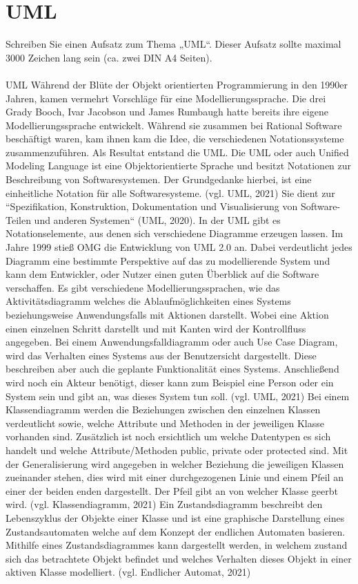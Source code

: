 \section{UML}
Schreiben Sie einen Aufsatz zum Thema „UML“. Dieser Aufsatz sollte maximal 3000 Zeichen lang sein (ca. zwei DIN A4 Seiten).\\
\\
UML
Während der Blüte der Objekt orientierten Programmierung in den 1990er Jahren, kamen vermehrt Vorschläge für eine Modellierungssprache. Die drei Grady Booch, Ivar Jacobson und James Rumbaugh hatte bereits ihre eigene Modellierungssprache entwickelt. Während sie zusammen bei Rational Software beschäftigt waren, kam ihnen kam die Idee, die verschiedenen Notationssysteme zusammenzuführen. Als Resultat entstand die UML. Die UML oder auch Unified Modeling Language ist eine Objektorientierte Sprache und besitzt Notationen zur Beschreibung von Softwaresystemen. Der Grundgedanke hierbei, ist eine einheitliche Notation für alle Softwaresysteme. (vgl. UML, 2021) Sie dient zur “Spezifikation, Konstruktion, Dokumentation und Visualisierung von Software-Teilen und anderen Systemen“ (UML, 2020). In der UML gibt es Notationselemente, aus denen sich verschiedene Diagramme erzeugen lassen. Im Jahre 1999 stieß OMG die Entwicklung von UML 2.0 an. Dabei verdeutlicht jedes Diagramm eine bestimmte Perspektive auf das zu modellierende System und kann dem Entwickler, oder Nutzer einen guten Überblick auf die Software verschaffen.
Es gibt verschiedene Modellierungssprachen, wie das Aktivitätsdiagramm welches die Ablaufmöglichkeiten eines Systems beziehungsweise Anwendungsfalls mit Aktionen darstellt. Wobei eine Aktion einen einzelnen Schritt darstellt und mit Kanten wird der Kontrollfluss angegeben.
Bei einem Anwendungsfalldiagramm oder auch Use Case Diagram, wird das Verhalten eines Systems aus der Benutzersicht dargestellt. Diese beschreiben aber auch die geplante Funktionalität eines Systems. Anschließend wird noch ein Akteur benötigt, dieser kann zum Beispiel eine Person oder ein System sein und gibt an, was dieses System tun soll. (vgl. UML, 2021)
Bei einem Klassendiagramm werden die Beziehungen zwischen den einzelnen Klassen verdeutlicht sowie, welche Attribute und Methoden in der jeweiligen Klasse vorhanden sind. Zusätzlich ist noch ersichtlich um welche Datentypen es sich handelt und welche Attribute/Methoden public, private oder protected sind. Mit der Generalisierung wird angegeben in welcher Beziehung die jeweiligen Klassen zueinander stehen, dies wird mit einer durchgezogenen Linie und einem Pfeil an einer der beiden enden dargestellt. Der Pfeil gibt an von welcher Klasse geerbt wird. (vgl. Klassendiagramm, 2021)
Ein Zustandsdiagramm beschreibt den Lebenszyklus der Objekte einer Klasse und ist eine graphische Darstellung eines Zustandsautomaten welche auf dem Konzept der endlichen Automaten basieren. Mithilfe eines Zustandsdiagrammes kann dargestellt werden, in welchem zustand sich das betrachtete Objekt befindet und welches Verhalten dieses Objekt in einer aktiven Klasse modelliert. (vgl. Endlicher Automat, 2021)

